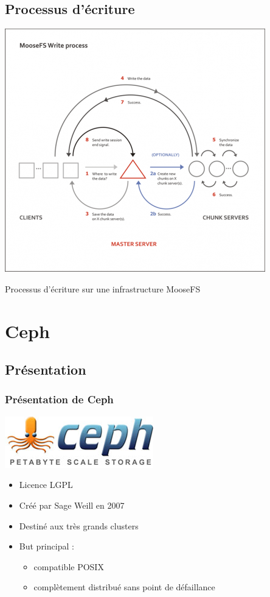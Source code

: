 \documentclass[blue]{beamer}
\begin{document}
\subsection{Processus d'écriture}
\begin{frame}
\begin{center}
\includegraphics[width=0.6\linewidth]{../images/mastersrvwrite.png}
\end{center}
Processus d'écriture sur une infrastructure MooseFS
\end{frame}

\section{Ceph}
        \subsection{Présentation}
        \begin{frame}
                \frametitle{Présentation de Ceph}
                \begin{center}
		       \includegraphics[width=0.30\linewidth]{../images/cephfs.jpg}
		\end{center}
		\begin{itemize}
			\item Licence LGPL
			\item Créé par Sage Weill en 2007
			\item Destiné aux très grands clusters
			\item But principal : 
                              \begin{itemize}
                                      \item compatible POSIX
                                      \item complètement distribué sans point de défaillance
                              \end{itemize}
		\end{itemize}
        \end{frame}
\end{document}
